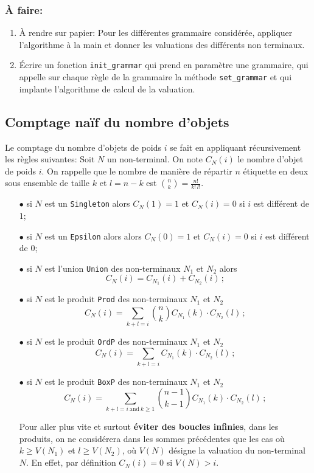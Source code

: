\documentclass[11pt]{article}
\renewcommand{\emph}[1]{\textbf{#1}}
\newcounter{asuivre}
\newenvironment{asks}{\begin{enumerate}\setcounter{enumi}{\theasuivre}}%
                       {\setcounter{asuivre}{\theenumi}\end{enumerate}}
\begin{document}
\subsubsection{À faire:}

\begin{asks}
\item À rendre sur papier: Pour les différentes grammaire considérée, appliquer
  l'algorithme à la main et donner les valuations des différents non
  terminaux.
\item Écrire un fonction \texttt{init\_grammar} qui prend en paramètre une
  grammaire, qui appelle sur chaque règle de la grammaire la méthode
  \verb+set_grammar+ et qui implante l'algorithme de calcul de la valuation. 
\end{asks}

\subsection{Comptage naïf du nombre d'objets}

Le comptage du nombre d'objets de poids $i$ se fait en appliquant
récursivement les règles suivantes:
Soit $N$ un non-terminal. On note $C_N(i)$ le nombre d'objet de poids $i$.
On rappelle que le nombre de manière de répartir $n$ étiquette en deux sous
ensemble de taille $k$ et $l=n-k$ est $\binom{n}{k} = \frac{n!}{k!\,l!}$.
\begin{itemize}
\item[$\bullet$] si $N$ est un \texttt{Singleton} alors $C_N(1) = 1$ et $C_N(i)
  = 0$ si $i$ est différent de $1$;
\item[$\bullet$] si $N$ est un \texttt{Epsilon} alors alors $C_N(0) = 1$ et
  $C_N(i) = 0$ si $i$ est différent de $0$;
\item[$\bullet$] si $N$ est l'union \texttt{Union} des non-terminaux $N_1$ et
  $N_2$ alors
  $$C_N(i) = C_{N_1}(i) + C_{N_2}(i)\,;$$
\item[$\bullet$] si $N$ est le produit \texttt{Prod} des non-terminaux $N_1$ et
  $N_2$
  $$C_N(i) = \sum_{k+l=i} \binom{n}{k} C_{N_1}(k) \cdot C_{N_2}(l)\,;$$
\item[$\bullet$] si $N$ est le produit \texttt{OrdP} des non-terminaux $N_1$ et
  $N_2$
  $$C_N(i) = \sum_{k+l=i} C_{N_1}(k) \cdot C_{N_2}(l)\,;$$
\item[$\bullet$] si $N$ est le produit \texttt{BoxP} des non-terminaux $N_1$ et
  $N_2$
  $$C_N(i) = \sum_{k+l=i\ \text{and}\ k \geq 1}
  \binom{n-1}{k-1} C_{N_1}(k) \cdot C_{N_2}(l)\,;$$

  Pour aller plus vite et surtout \emph{éviter des boucles infinies}, dans les
  produits, on ne considérera dans les sommes précédentes que les cas où $k \geq
  V(N_1)$ et $l \geq V(N_2)$, où $V(N)$ désigne la valuation du non-terminal
  $N$. En effet, par définition $C_N(i) = 0$ si $V(N) > i$.
\end{itemize}
\end{document}
